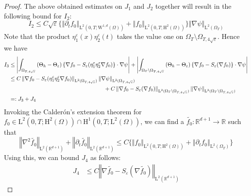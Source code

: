 \documentclass[preprint, 12pt]{amsart}
\numberwithin{equation}{section}
\numberwithin{equation}{section}
\newcommand\RR{\mathbb{R}}
\newcommand{\eps}{\varepsilon}
\begin{document}
\begin{proof}
The above obtained estimates on $J_1$ and $J_2$ together will result in the following bound for $I_2$:
\begin{equation*}
I_2 \leq C \sqrt{\eps} \big\{ \left\Vert \partial_t f_0 \right\Vert_{\mathrm L^2(0,T;\mathrm W^{1,d}(\Omega))}  + \left\Vert f_0 \right\Vert_{\mathrm L^2(0,T;\mathrm H^2(\Omega))} \big\} \left\Vert \nabla \psi \right\Vert_{\mathrm L^2(\Omega_T)}
\end{equation*}
Note that the product $\eta_1^\eps(x)\eta_2^\eps(t)$ takes the value one on $\Omega_T\setminus \Omega_{T,4\sqrt{\eps}}$. Hence we have
\begin{equation*}
\begin{aligned}
I_3 & \le \left\vert \int_{\Omega_{T,4\sqrt{\eps}}}\left(\Theta_h - \Theta_\eps\right) \left\{\nabla f_0 - S_\eps(\eta_1^\eps\eta_2^\eps \nabla f_0)\right\} \cdot \nabla \psi\right\vert
+ \left\vert \int_{\Omega_T\setminus\Omega_{T,4\sqrt{\eps}}}\left(\Theta_h - \Theta_\eps\right) \left\{\nabla f_0 - S_\eps(\nabla f_0)\right\} \cdot \nabla \psi\right\vert
\\
& \le C  \left\Vert \nabla f_0 - S_\eps(\eta_1^\eps\eta_2^\eps \nabla f_0) \right\Vert_{\mathrm L^2(\Omega_{T,4\sqrt{\eps}})}
\left\Vert \nabla \psi \right\Vert_{\mathrm L^2(\Omega_{T,4\sqrt{\eps}})}
\\
& \hspace{6.0cm} + C \left\Vert \nabla f_0 - S_\eps(\nabla f_0) \right\Vert_{\mathrm L^2(\Omega_T\setminus\Omega_{T,4\sqrt{\eps}})}
\left\Vert \nabla \psi \right\Vert_{\mathrm L^2(\Omega_T\setminus\Omega_{T,4\sqrt{\eps}})}
\\
& =: J_3 + J_4
\end{aligned}
\end{equation*}
Invoking the Calder\'on's extension theorem for $f_0\in \mathrm L^2(0,T;\mathrm H^2(\Omega))\cap\mathrm H^1(0,T;\mathrm L^2(\Omega))$, we can find a $\widetilde{f_0}:\RR^{d+1}\to\RR$ such that
\begin{equation*}
\left\Vert \nabla^2 \widetilde{f_0} \right\Vert_{\mathrm L^2(\RR^{d+1})}
+ \left\Vert \partial_t \widetilde{f_0} \right\Vert_{\mathrm L^2(\RR^{d+1})}
\le C \Big\{
\left\Vert f_0 \right\Vert_{\mathrm L^2(0,T;\mathrm H^2(\Omega))} 
+ \left\Vert \partial_t f_0 \right\Vert_{\mathrm L^2(\Omega_T)}
\Big\}
\end{equation*}
Using this, we can bound $J_4$ as follows:
\begin{equation*}
\begin{aligned}
J_4 & \le C \left\Vert \nabla \widetilde{f_0} - S_\eps(\nabla \widetilde{f_0}) \right\Vert_{\mathrm L^2(\RR^{d+1})}

\end{aligned}
\end{equation*}
\end{proof}
\end{document}
